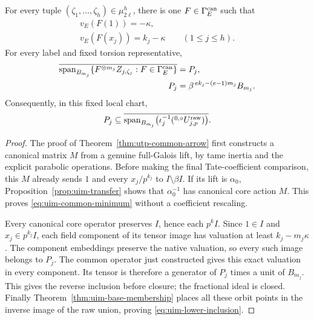 \begin{corollary}
\label{cor:uim-canonical-hull}
For every tuple
\((\zeta_1,\ldots,\zeta_h)\in\mu_{2\ell}^h\),
there is one \(F\in\Gamma_E^{\rm can}\) such that
\begin{equation}\label{eq:uim-common-minimum}
 \begin{gathered}
 v_E(F(1))=-\kappa,\\
 v_E(F(x_j))=k_j-\kappa\qquad(1\le j\le h).
 \end{gathered}
\end{equation}
For every label and fixed torsion representative,
\begin{equation}\label{eq:uim-canonical-hull}
 \begin{split}
 \overline{\operatorname{span}_{B_{m_j}}
    \{F^{\otimes m_j}Z_{j,\zeta_j}:
                                F\in\Gamma_E^{\rm can}\}}
      &=P_j,\\
 P_j&=\beta^{\,e k_j-(e-1)m_j}B_{m_j}.
 \end{split}
\end{equation}
Consequently, in this fixed local chart,
\begin{equation}\label{eq:uim-lower-inclusion}
 P_j\subseteq
 \overline{\operatorname{span}_{B_{m_j}}
       \bigl(\iota_j^{-1}({}^{0,\circ}U^{\rm raw}_{j,p})\bigr)}.
\end{equation}
\end{corollary}
\begin{proof}
The proof of
Theorem~\ref{thm:utp-common-arrow}
first constructs a canonical
matrix \(M\) from a genuine
full-Galois lift, by tame
inertia and the explicit
parabolic operations.
Before making the final
Tate-coefficient comparison,
this \(M\) already sends
\(1\) and every \(x_j/p^{k_j}\)
to \(I\setminus\beta I\).
If its lift is \(\alpha_0\),
Proposition~\ref{prop:uim-transfer}
shows that \(\alpha_0^{-1}\)
has canonical core action \(M\).
This proves
\eqref{eq:uim-common-minimum}
without a coefficient rescaling.

Every canonical core operator
preserves \(I\), hence each
\(p^kI\). Since \(1\in I\)
and \(x_j\in p^{k_j}I\),
each field component of its
tensor image has valuation
at least \(k_j-m_j\kappa\).
The component embeddings
preserve the native valuation,
so every such image belongs
to \(P_j\). The common
operator just constructed
gives this exact valuation
in every component. Its
tensor is therefore a
generator of \(P_j\) times
a unit of \(B_{m_j}\).
This gives the reverse
inclusion before closure;
the fractional ideal is closed.
Finally
Theorem~\ref{thm:uim-base-membership}
places all these orbit points
in the inverse image of the
raw union, proving
\eqref{eq:uim-lower-inclusion}.
\end{proof}

